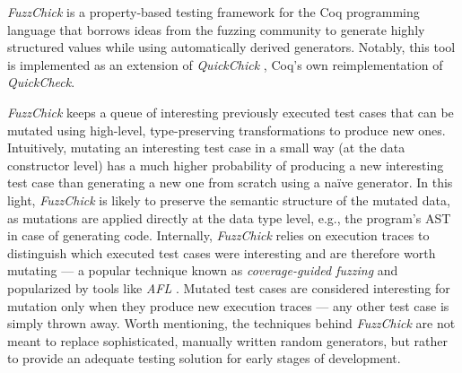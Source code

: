 \documentclass[sigconf, anonymous]{acmart}
\newcommand{\quickcheck}{\textit{QuickCheck}\xspace}
\newcommand{\quickchick}{\textit{QuickChick}\xspace}
\newcommand{\fuzzchick}{\textit{FuzzChick}\xspace}
\begin{document}
\fuzzchick \cite{lampropoulos2019coverage} is a property-based testing framework
for the Coq programming language that borrows ideas from the fuzzing community
to generate highly structured values while using automatically derived
generators.
%
Notably, this tool is implemented as an extension of \quickchick
\cite{denes2014quickchick}, Coq's own reimplementation of \quickcheck.


\fuzzchick keeps a queue of interesting previously executed test cases that can
be mutated using high-level, type-preserving transformations to produce new
ones.
%
Intuitively, mutating an interesting test case in a small way (at the data
constructor level) has a much higher probability of producing a new interesting
test case than generating a new one from scratch using a na\"ive generator.
%
In this light, \fuzzchick is likely to preserve the semantic structure of the
mutated data, as mutations are applied directly at the data type level, e.g.,
the program's AST in case of generating code.
%
Internally, \fuzzchick relies on execution traces to distinguish which executed
test cases were interesting and are therefore worth mutating --- a popular
technique known as \emph{coverage-guided fuzzing} and popularized by tools like
\emph{AFL} \cite{afl}.
%
Mutated test cases are considered interesting for mutation only when they
produce new execution traces --- any other test case is simply thrown away.
%
Worth mentioning, the techniques behind \fuzzchick are not meant to replace
sophisticated, manually written random generators, but rather to provide an
adequate testing solution for early stages of development.
\end{document}
